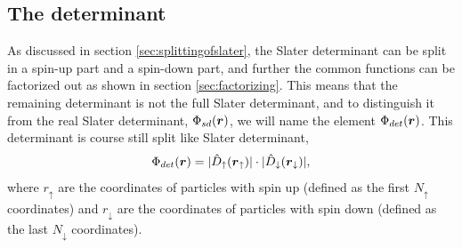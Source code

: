\subsection{The determinant} \label{sec:slaterdeterminant}
As discussed in section \ref{sec:splittingofslater}, the Slater determinant can be split in a spin-up part and a spin-down part, and further the common functions can be factorized out as shown in section \ref{sec:factorizing}. This means that the remaining determinant is not the full Slater determinant, and to distinguish it from the real Slater determinant, $\Phi_{sd}(\boldsymbol{{r}})$, we will name the element $\Phi_{det}(\boldsymbol{{r}})$. This determinant is course still split like Slater determinant, 
\begin{equation}
\Phi_{det}(\boldsymbol{{r}})=
|\hat{D}_{\uparrow}(\boldsymbol{{r}}_{\uparrow})|\cdot |\hat{D}_{\downarrow}(\boldsymbol{{r}}_{\downarrow})|,
\end{equation}
where $r_{\uparrow}$ are the coordinates of particles with spin up (defined as the first $N_{\uparrow}$ coordinates) and $r_{\downarrow}$ are the coordinates of particles with spin down (defined as the last $N_{\downarrow}$ coordinates). 

